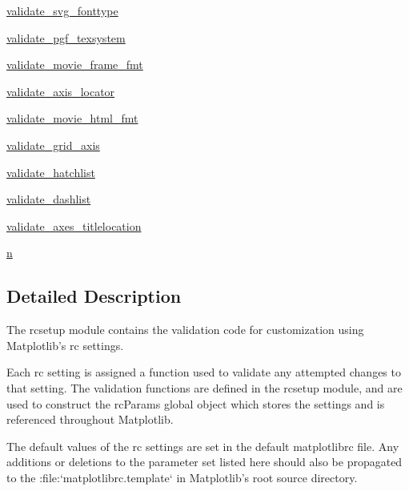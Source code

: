 \begin{DoxyCompactItemize}
\item 
\hyperlink{namespacematplotlib_1_1rcsetup_ab41e9a3106e1ebc153a2dcb2f21049ed}{validate\+\_\+svg\+\_\+fonttype}
\item 
\hyperlink{namespacematplotlib_1_1rcsetup_a5c83d5cd73da977c1a140e1732ce722b}{validate\+\_\+pgf\+\_\+texsystem}
\item 
\hyperlink{namespacematplotlib_1_1rcsetup_afe827005e0d1a1f2df04f7aa61a29b30}{validate\+\_\+movie\+\_\+frame\+\_\+fmt}
\item 
\hyperlink{namespacematplotlib_1_1rcsetup_a136987e29503a23f01e1f3b37d6e224d}{validate\+\_\+axis\+\_\+locator}
\item 
\hyperlink{namespacematplotlib_1_1rcsetup_ab5ebf63e2d5a69830c91ef92ff7b9fa1}{validate\+\_\+movie\+\_\+html\+\_\+fmt}
\item 
\hyperlink{namespacematplotlib_1_1rcsetup_a8ffc1dee3fc67686e5a0c6e3f1ddee22}{validate\+\_\+grid\+\_\+axis}
\item 
\hyperlink{namespacematplotlib_1_1rcsetup_ab8f0e02c71c15ced77eb3bbb8a541a48}{validate\+\_\+hatchlist}
\item 
\hyperlink{namespacematplotlib_1_1rcsetup_ab7fca29a01e12e0f88f7f74d3b034a39}{validate\+\_\+dashlist}
\item 
\hyperlink{namespacematplotlib_1_1rcsetup_a6bfc33c4009146e4e25cf222ba55fd0b}{validate\+\_\+axes\+\_\+titlelocation}
\item 
\hyperlink{namespacematplotlib_1_1rcsetup_acce693f276e6fb23ae89de2f5d01edfe}{n}
\end{DoxyCompactItemize}


\subsection{Detailed Description}
\begin{DoxyVerb}The rcsetup module contains the validation code for customization using
Matplotlib's rc settings.

Each rc setting is assigned a function used to validate any attempted changes
to that setting.  The validation functions are defined in the rcsetup module,
and are used to construct the rcParams global object which stores the settings
and is referenced throughout Matplotlib.

The default values of the rc settings are set in the default matplotlibrc file.
Any additions or deletions to the parameter set listed here should also be
propagated to the :file:`matplotlibrc.template` in Matplotlib's root source
directory.
\end{DoxyVerb}
 


